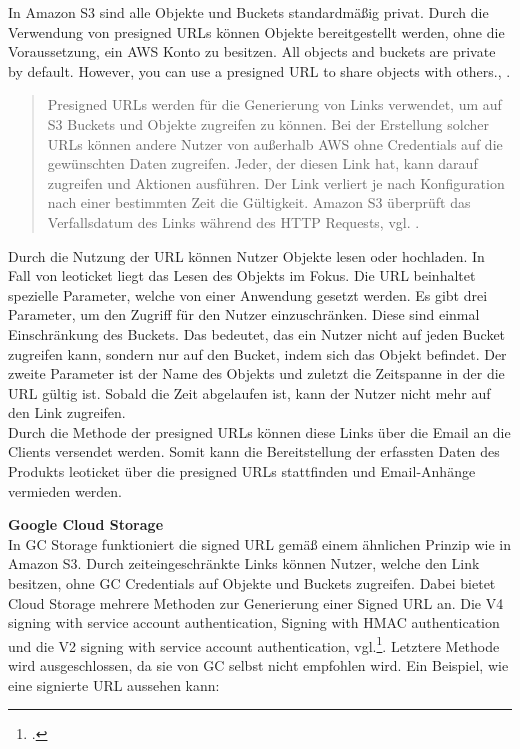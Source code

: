 In Amazon S3 sind alle Objekte und Buckets standardmäßig privat. Durch die Verwendung von presigned URLs können Objekte bereitgestellt werden, ohne die Voraussetzung, ein AWS Konto zu besitzen. \glqq All objects and buckets are private by default. However, you can use a presigned URL to share objects with others.\grqq, \cite{aws-signed-urls}. 

\begin{quote}
	Presigned URLs werden für die Generierung von Links verwendet, um auf S3 Buckets und Objekte zugreifen zu können. Bei der Erstellung solcher URLs können andere Nutzer von außerhalb AWS ohne Credentials auf die gewünschten Daten zugreifen. Jeder, der diesen Link hat, kann darauf zugreifen und Aktionen ausführen. Der Link verliert je nach Konfiguration nach einer bestimmten Zeit die Gültigkeit. Amazon S3 überprüft das Verfallsdatum des Links während des HTTP Requests, vgl. \cite{aws-signed-urls}. 
\end{quote}

Durch die Nutzung der URL können Nutzer Objekte lesen oder hochladen. In Fall von leoticket liegt das Lesen des Objekts im Fokus. Die URL beinhaltet spezielle Parameter, welche von einer Anwendung gesetzt werden. Es gibt drei Parameter, um den Zugriff für den Nutzer einzuschränken. Diese sind einmal Einschränkung des Buckets. Das bedeutet, das ein Nutzer nicht auf jeden Bucket zugreifen kann, sondern nur auf den Bucket, indem sich das Objekt befindet. Der zweite Parameter ist der Name des Objekts und zuletzt die Zeitspanne in der die URL gültig ist. Sobald die Zeit abgelaufen ist, kann der Nutzer nicht mehr auf den Link zugreifen.\\

Durch die Methode der presigned URLs können diese Links über die Email an die Clients versendet werden. Somit kann die Bereitstellung der erfassten Daten des Produkts leoticket über die presigned URLs stattfinden und Email-Anhänge vermieden werden.

\newpage

\textbf{Google Cloud Storage}\\

In GC Storage funktioniert die signed URL gemäß einem ähnlichen Prinzip wie in Amazon S3. Durch zeiteingeschränkte Links können Nutzer, welche den Link besitzen, ohne GC Credentials auf Objekte und Buckets zugreifen. Dabei bietet Cloud Storage mehrere Methoden zur Generierung einer Signed URL an. Die V4 signing with service account authentication, Signing with HMAC authentication und die V2 signing with service account authentication, vgl.\footcite{gc-signedUrl}. Letztere Methode wird ausgeschlossen, da sie von GC selbst nicht empfohlen wird. Ein Beispiel, wie eine signierte URL aussehen kann:

